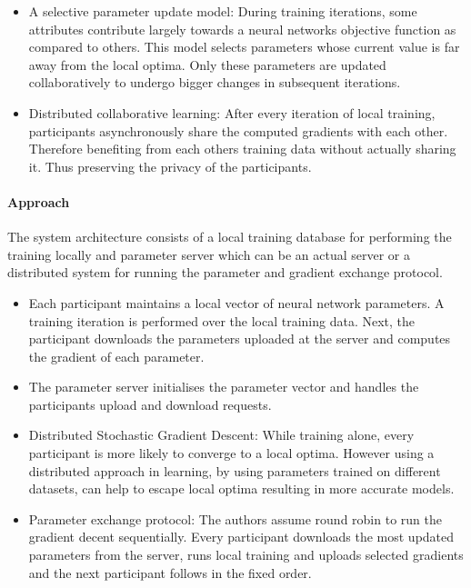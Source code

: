 \begin{itemize}
	\item A selective parameter update model: During training iterations, some attributes contribute largely
	towards a neural networks objective function as compared to others. This model selects parameters whose
	current value is far away from the local optima. Only these parameters are updated collaboratively to 
	undergo bigger changes in subsequent iterations. 
	
	\item Distributed collaborative learning: After every iteration of local training, participants
	asynchronously share the computed gradients with each other. Therefore benefiting from each others
	training data without actually sharing it. Thus preserving the privacy of the participants.  
	
\end{itemize}

\paragraph{Approach}

The system architecture consists of a local training database for performing the training locally
and parameter server which can be an actual server or a distributed system for running the parameter 
and gradient exchange protocol. 

\begin{itemize}
	\item Each participant maintains a local vector of neural network parameters. A training iteration
	is performed over the local training data. Next, the participant downloads the parameters uploaded 
	at the server and computes the gradient of each parameter. 
	
	\item The parameter server initialises the parameter vector and handles the participants upload and 
	download requests. 
	
	\item Distributed Stochastic Gradient Descent: While training alone, every participant is more likely 
	to converge to a local optima. However using a distributed approach in learning, by using parameters
	trained on different datasets, can help to escape local optima resulting in more accurate models. 
	
	\item Parameter exchange protocol: The authors assume round robin to run the gradient decent 
	sequentially. Every participant downloads the most updated parameters from the server, runs local 
	training and uploads selected gradients and the next participant follows in the fixed order. 
\end{itemize}

